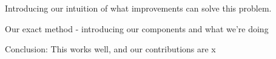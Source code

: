 \documentclass{article}
\begin{document}
Introducing our intuition of what improvements can solve this problem.

Our exact method - introducing our components and what we're doing

Conclusion: This works well, and our contributions are x












\end{document}
